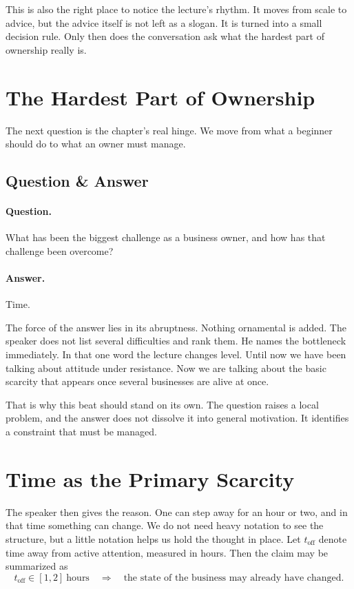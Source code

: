 This is also the right place to notice the lecture's rhythm. It moves from scale to advice, but the advice itself is not left as a slogan. It is turned into a small decision rule. Only then does the conversation ask what the hardest part of ownership really is.

\section{The Hardest Part of Ownership}

The next question is the chapter's real hinge. We move from what a beginner should do to what an owner must manage.

\subsection{Question \& Answer}

\paragraph{Question.}
What has been the biggest challenge as a business owner, and how has that challenge been overcome?

\paragraph{Answer.}
Time.

The force of the answer lies in its abruptness. Nothing ornamental is added. The speaker does not list several difficulties and rank them. He names the bottleneck immediately. In that one word the lecture changes level. Until now we have been talking about attitude under resistance. Now we are talking about the basic scarcity that appears once several businesses are alive at once.

That is why this beat should stand on its own. The question raises a local problem, and the answer does not dissolve it into general motivation. It identifies a constraint that must be managed.

\section{Time as the Primary Scarcity}

The speaker then gives the reason. One can step away for an hour or two, and in that time something can change. We do not need heavy notation to see the structure, but a little notation helps us hold the thought in place. Let \(t_{\mathrm{off}}\) denote time away from active attention, measured in hours. Then the claim may be summarized as
\begin{equation}
t_{\mathrm{off}} \in [1,2]\ \text{hours}
\quad\Longrightarrow\quad
\text{the state of the business may already have changed.}
\end{equation}

